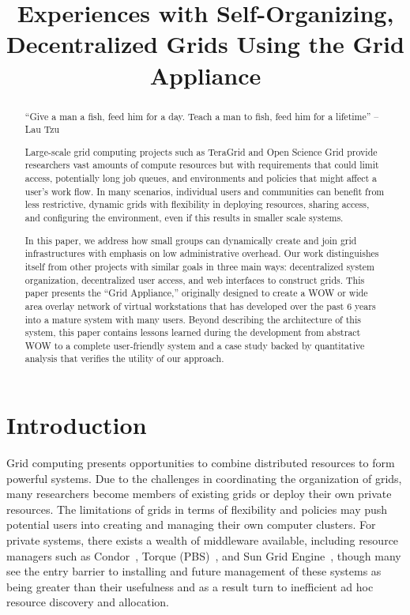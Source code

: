 \documentclass[conference]{IEEEtran}
\begin{document}
\title{Experiences with Self-Organizing, Decentralized Grids Using the Grid
Appliance}

\author{
}

\maketitle


\begin{abstract}

``Give a man a fish, feed him for a day.  Teach a man to fish, feed him for a
lifetime'' -- Lau Tzu

Large-scale grid computing projects such as TeraGrid and Open Science Grid
provide researchers vast amounts of compute resources but with requirements
that could limit access, potentially long job queues, and environments and
policies that might affect a user's work flow. In many scenarios, individual
users and communities can benefit from less restrictive, dynamic grids with
flexibility in deploying resources, sharing access, and configuring the
environment, even if this results in smaller scale systems.

In this paper, we address how small groups can dynamically create and join grid
infrastructures with emphasis on low administrative overhead.  Our work
distinguishes itself from other projects with similar goals in three main ways:
decentralized system organization, decentralized user access, and web
interfaces to construct grids.  This paper presents the ``Grid Appliance,''
originally designed to create a WOW or wide area overlay network of virtual
workstations that has developed over the past 6 years into a mature system with
many users.  Beyond describing the architecture of this system, this paper
contains lessons learned during the development from abstract WOW to a complete
user-friendly system and a case study backed by quantitative analysis that
verifies the utility of our approach.  

\end{abstract}

\section{Introduction}

Grid computing presents opportunities to combine distributed resources to form
powerful systems.  Due to the challenges in coordinating the organization of
grids, many researchers become members of existing grids or deploy their own
private resources.  The limitations of grids in terms of flexibility and
policies may push potential users into creating and managing their own computer
clusters.  For private systems, there exists a wealth of middleware available,
including resource managers such as Condor~\cite{condor0}, Torque
(PBS)~\cite{torque}, and Sun Grid Engine~\cite{grid_engine}, though many see
the entry barrier to installing and future management of these systems as being
greater than their usefulness and as a result turn to inefficient ad hoc
resource discovery and allocation.
\end{document}
